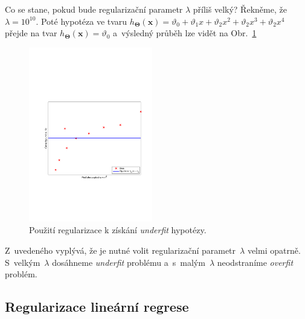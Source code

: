 \par{Co se stane, pokud bude regularizační parametr $\lambda$ příliš velký? Řekněme, že $\lambda = 10^{10}$. Poté hypotéza ve tvaru $h_{\bm{\Theta}} \left( \bm{x} \right) = \vartheta_0 + \vartheta_1 x + \vartheta_2 x^2 + \vartheta_2 x^3 + \vartheta_2 x^4$ přejde na tvar $h_{\bm{\Theta}} \left( \bm{x} \right) = \vartheta_0$ a~výsledný průběh lze vidět na Obr.~\ref{fig:regularizaceUnderfit}}
\begin{figure}[!ht]
	\centering
	\includegraphics[width = 0.48\textwidth, trim = 2.5cm 7cm 2cm 9cm]{./Img/Regularizace/ZtratovaFunkce/regrese_underfit.pdf}
	\caption{Použití regularizace k získání \textit{underfit} hypotézy.}
	\label{fig:regularizaceUnderfit}
\end{figure}

\par{Z~uvedeného vyplývá, že je nutné volit regularizační parametr~$\lambda$ velmi opatrně. S~velkým~$\lambda$ dosáhneme \textit{underfit} problému a~s~malým~$\lambda$ neodstraníme \textit{overfit} problém.}

\newpage

















\subsection{Regularizace lineární regrese}
\label{sec:RegularizaceLinearniRegrese}

